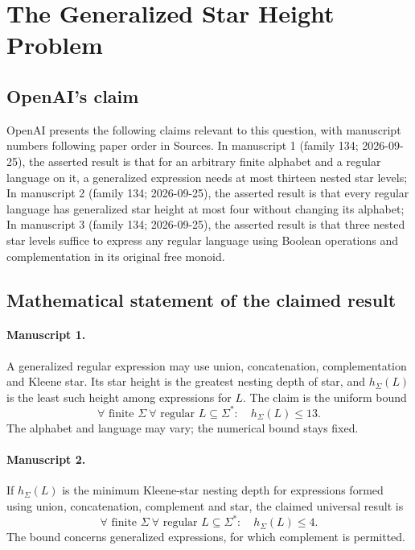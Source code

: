 \documentclass[11pt]{article}
\begin{document}
\section*{The Generalized Star Height Problem}

\subsection{OpenAI's claim}
OpenAI presents the following claims relevant to this question, with manuscript numbers following paper order in Sources. In manuscript 1 (family 134; 2026-09-25), the asserted result is that for an arbitrary finite alphabet and a regular language on it, a generalized expression needs at most thirteen nested star levels; In manuscript 2 (family 134; 2026-09-25), the asserted result is that every regular language has generalized star height at most four without changing its alphabet; In manuscript 3 (family 134; 2026-09-25), the asserted result is that three nested star levels suffice to express any regular language using Boolean operations and complementation in its original free monoid.

\subsection{Mathematical statement of the claimed result}
\paragraph{Manuscript 1.}
A generalized regular expression may use union, concatenation, complementation and Kleene star. Its star height is the greatest nesting depth of star, and $h_{\Sigma}(L)$ is the least such height among expressions for $L$. The claim is the uniform bound
\[
 \forall\text{ finite }\Sigma\ \forall\text{ regular }L\subseteq\Sigma^*:\quad h_{\Sigma}(L)\le13.
\]
The alphabet and language may vary; the numerical bound stays fixed.

\paragraph{Manuscript 2.}
If $h_{\Sigma}(L)$ is the minimum Kleene-star nesting depth for expressions formed using union, concatenation, complement and star, the claimed universal result is
\[
 \forall\text{ finite }\Sigma\ \forall\text{ regular }L\subseteq\Sigma^*:\quad h_{\Sigma}(L)\le4.
\]
The bound concerns generalized expressions, for which complement is permitted.
\end{document}
